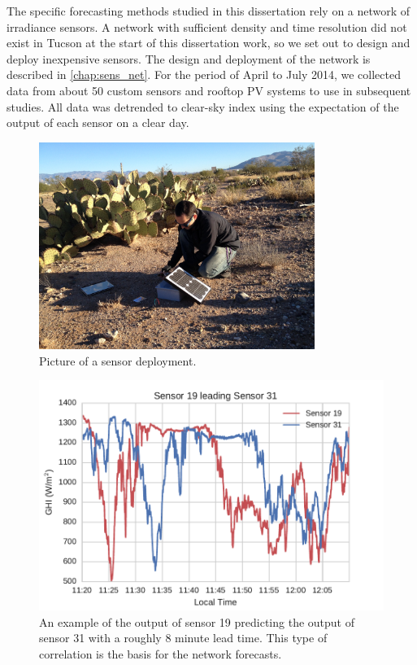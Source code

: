 The specific forecasting methods studied in this dissertation rely on
a network of irradiance sensors.
A network with sufficient density and time resolution did not exist in
Tucson at the start of this dissertation work, so we set out to design
and deploy inexpensive sensors.
The design and deployment of the network is described in
\cref{chap:sens_net}.
For the period of April to July 2014, we collected data from about 50
custom sensors and rooftop PV systems to use in subsequent studies.
All data was detrended to clear-sky index using the expectation of the
output of each sensor on a clear day.

\begin{figure}[tbp]
\centering
\includegraphics[width=0.8\textwidth]{figs/sensdeploy.jpg}
\caption{Picture of a sensor deployment.}
\end{figure}

\begin{figure}[htbp]
\centering
\includegraphics[width=.85\textwidth]{figs/leading_sens.pdf}
\caption[One sensor predicting the output of another]{An example of
  the output of sensor 19 predicting the output of sensor 31 with a
  roughly 8 minute lead time. This type of correlation is the basis
  for the network forecasts.}
\label{fig:19leading31}
\end{figure}

